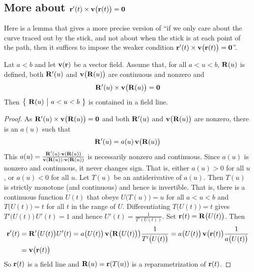 \subsection{More about $\mathbf{r}'(t)\times\mathbf{v}\big(\mathbf{r}(t)\big)=\mathbf{0}$}
            \label{sec:fieldLinePara}
Here is a lemma that gives a more precise version of
``if we only care about the curve traced out by the stick, and not about 
when the stick is at each point of the path, then it suffices to
impose the weaker condition 
$\mathbf{r}'(t)\times\mathbf{v}\big(\mathbf{r}(t)\big)=\mathbf{0}$''.
\begin{lemma}\label{lem:fieldLinePara}
Lat $a<b$ and let $\mathbf{v}(\mathbf{r})$ be a vector field. Assume that,
for all $a<u<b$,  $\mathbf{R}(u)$ is defined, both $\mathbf{R}'(u)$ and 
$\mathbf{v}\big(\mathbf{R}(u)\big)$ are continuous and  nonzero and
\begin{equation*}
\mathbf{R}'(u)\times\mathbf{v}\big(\mathbf{R}(u)\big)=\mathbf{0}
\end{equation*}
Then $\big\{ \ \mathbf{R}(u)\ \big|\ a<u<b\ \big\}$ is contained in a field line.
\end{lemma}
\begin{proof}
As $\mathbf{R}'(u)\times\mathbf{v}\big(\mathbf{R}(u)\big)=\mathbf{0}$ and  both 
$\mathbf{R}'(u)$ and $\mathbf{v}\big(\mathbf{R}(u)\big)$ are nonzero,  there is 
an $a(u)$ such that
\begin{equation*}
\mathbf{R}'(u) = a(u)\,\mathbf{v}\big(\mathbf{R}(u)\big)
\end{equation*} 
This $a(u)=\frac{\mathbf{R}'(u)\cdot\mathbf{v}(\mathbf{R}(u))}{\mathbf{v}(\mathbf{R}(u))\cdot\mathbf{v}(\mathbf{R}(u))}$ 
is necessarily nonzero and continuous. Since $a(u)$ is nonzero and continuous,
it never changes sign. That is, either $a(u)>0$ for all  $u$,
or $a(u)<0$ for all $u$. Let $T(u)$ be an antiderivative of $a(u)$. Then $T(u)$
is strictly monotone (and continuous) and hence is invertible. That is, there 
is a continuous function $U(t)$ that obeys $U\big(T(u)\big)=u$ for all 
$a<u<b$ and $T\big(U(t)\big)=t$ for all $t$ in the range of $U$.
Differentiating $T\big(U(t)\big)=t$ gives $T'\big(U(t)\big)\,U'(t)=1$ 
and hence $U'(t) = \frac{1}{T'(U(t))}$. Set 
$\mathbf{r}(t) = \mathbf{R}\big(U(t)\big)$.
Then
\begin{align*}
\mathbf{r}'(t) &= \mathbf{R}'\big(U(t)\big) U'(t)
        = a\big(U(t)\big)\,\mathbf{v}\big(\mathbf{R}\big(U(t)\big)\big)
                                    \frac{1}{T'\big(U(t)\big)}
        = a\big(U(t)\big)\,\mathbf{v}\big(\mathbf{r}(t)\big)
                                    \frac{1}{a\big(U(t)\big)} \\
        &=\mathbf{v}\big(\mathbf{r}(t)\big)
\end{align*}
So $\mathbf{r}(t)$ is a field line and $\mathbf{R}(u) = \mathbf{r}(T(u))$ 
is a reparametrization of $\mathbf{r}(t)$.
\end{proof}

